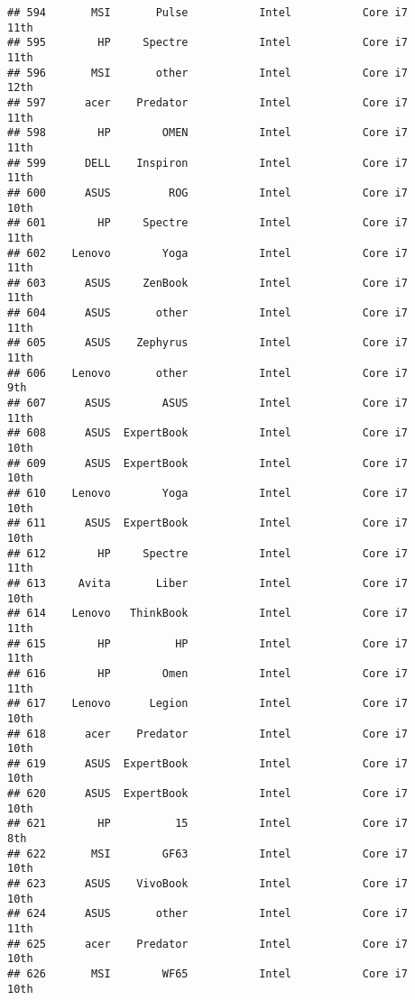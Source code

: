 \documentclass[
]{article}
\begin{document}
\begin{verbatim}
## 594       MSI       Pulse           Intel           Core i7            11th
## 595        HP     Spectre           Intel           Core i7            11th
## 596       MSI       other           Intel           Core i7            12th
## 597      acer    Predator           Intel           Core i7            11th
## 598        HP        OMEN           Intel           Core i7            11th
## 599      DELL    Inspiron           Intel           Core i7            11th
## 600      ASUS         ROG           Intel           Core i7            10th
## 601        HP     Spectre           Intel           Core i7            11th
## 602    Lenovo        Yoga           Intel           Core i7            11th
## 603      ASUS     ZenBook           Intel           Core i7            11th
## 604      ASUS       other           Intel           Core i7            11th
## 605      ASUS    Zephyrus           Intel           Core i7            11th
## 606    Lenovo       other           Intel           Core i7             9th
## 607      ASUS        ASUS           Intel           Core i7            11th
## 608      ASUS  ExpertBook           Intel           Core i7            10th
## 609      ASUS  ExpertBook           Intel           Core i7            10th
## 610    Lenovo        Yoga           Intel           Core i7            10th
## 611      ASUS  ExpertBook           Intel           Core i7            10th
## 612        HP     Spectre           Intel           Core i7            11th
## 613     Avita       Liber           Intel           Core i7            10th
## 614    Lenovo   ThinkBook           Intel           Core i7            11th
## 615        HP          HP           Intel           Core i7            11th
## 616        HP        Omen           Intel           Core i7            11th
## 617    Lenovo      Legion           Intel           Core i7            10th
## 618      acer    Predator           Intel           Core i7            10th
## 619      ASUS  ExpertBook           Intel           Core i7            10th
## 620      ASUS  ExpertBook           Intel           Core i7            10th
## 621        HP          15           Intel           Core i7             8th
## 622       MSI        GF63           Intel           Core i7            10th
## 623      ASUS    VivoBook           Intel           Core i7            10th
## 624      ASUS       other           Intel           Core i7            11th
## 625      acer    Predator           Intel           Core i7            10th
## 626       MSI        WF65           Intel           Core i7            10th

\end{verbatim}
\end{document}
